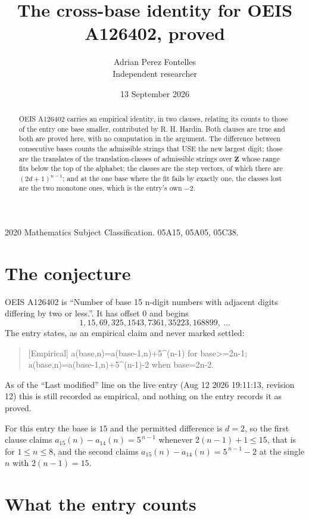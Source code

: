 \documentclass[11pt,a4paper]{article}
\title{The cross-base identity for OEIS A126402, proved}
\author{Adrian Perez Fontelles\\ \small Independent researcher}
\date{13 September 2026}
\theoremstyle{plain}
\theoremstyle{definition}
\begin{document}
\maketitle

\begin{abstract}
OEIS A126402 carries an empirical identity, in two clauses, relating its counts to those of the
entry one base smaller, contributed by R. H. Hardin. Both clauses are true and both are proved
here, with no computation in the argument. The difference between consecutive bases counts the
admissible strings that USE the new largest digit; those are the translates of the
translation-classes of admissible strings over $\mathbf{Z}$ whose range fits below the top of
the alphabet; the classes are the step vectors, of which there are $(2d+1)^{n-1}$; and at the
one base where the fit fails by exactly one, the classes lost are the two monotone ones, which
is the entry's own $-2$.
\end{abstract}

\noindent\small 2020 Mathematics Subject Classification. 05A15, 05A05, 05C38.\normalsize

\section{The conjecture}

OEIS A126402 is ``Number of base 15 n-digit numbers with adjacent digits differing by two or less.''. It has offset $0$ and begins
\[
1, 15, 69, 325, 1543, 7361, 35223, 168899,\ \dots
\]
The entry states, as an empirical claim and never marked settled:
\begin{quote}
[Empirical] a(base,n)=a(base-1,n)+5\textasciicircum{}(n-1) for base>=2n-1; a(base,n)=a(base-1,n)+5\textasciicircum{}(n-1)-2 when base=2n-2.
\end{quote}
As of the ``Last modified'' line on the live entry (Aug 12 2026 19:11:13, revision 12)
this is still recorded as empirical, and nothing on the entry records it as proved.

For this entry the base is $15$ and the permitted difference is $d=2$, so the first clause
claims $a_{15}(n)-a_{14}(n)=5^{\,n-1}$ whenever $2(n-1)+1\le15$, that is for
$1\le n\le8$, and the second claims $a_{15}(n)-a_{14}(n)=5^{\,n-1}-2$ at the single
$n$ with $2(n-1)=15$.

\section{What the entry counts}
\end{document}
